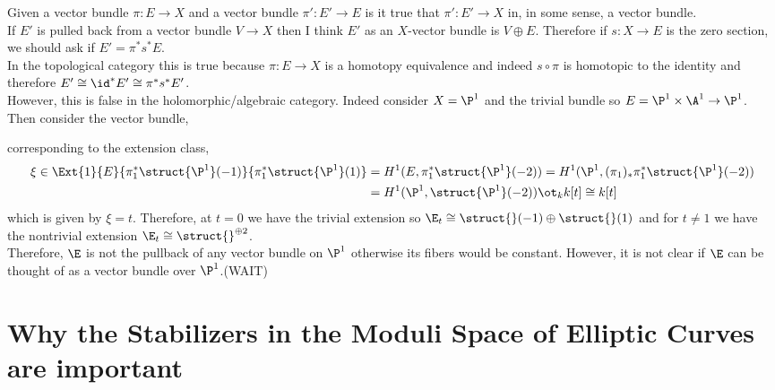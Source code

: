 \documentclass[12pt]{article}
\begin{document}
Given a vector bundle $\pi : E \to X$ and a vector bundle $\pi' : E' \to E$ is it true that $\pi' : E' \to X$ in, in some sense, a vector bundle. 
\bigskip\\
If $E'$ is pulled back from a vector bundle $V \to X$ then I think $E'$ as an $X$-vector bundle is $V \oplus E$. Therefore if $s : X \to E$ is the zero section, we should ask if $E' = \pi^* s^* E$. 
\bigskip\\
In the topological category this is true because $\pi : E \to X$ is a homotopy equivalence and indeed $s \circ \pi$ is homotopic to the identity and therefore $E' \cong \id^* E' \cong \pi^* s^* E'$. 
\bigskip\\
However, this is false in the holomorphic/algebraic category. Indeed consider $X = \P^1$ and the trivial bundle so $E = \P^1 \times \A^1 \to \P^1$. Then consider the vector bundle,
\begin{center}
\end{center}
corresponding to the extension class,
\begin{align*}
\xi \in \Ext{1}{E}{\pi_1^* \struct{\P^1}(-1)}{\pi_1^* \struct{\P^1}(1)} & = H^1(E, \pi_1^* \struct{\P^1}(-2)) = H^1(\P^1, (\pi_1)_* \pi_1^* \struct{\P^1}(-2))
\\
& = H^1(\P^1, \struct{\P^1}(-2)) \ot_k k[t] \cong k[t]
\end{align*}
which is given by $\xi = t$. Therefore, at $t = 0$ we have the trivial extension so $\E_t \cong \struct{}(-1) \oplus \struct{}(1)$ and for $t \neq 1$ we have the nontrivial extension $\E_t \cong \struct{}^{\oplus 2}$.
\bigskip\\
Therefore, $\E$ is not the pullback of any vector bundle on $\P^1$ otherwise its fibers would be constant. However, it is not clear if $\E$ can be thought of as a vector bundle over $\P^1$.(WAIT)

\section{Why the Stabilizers in the Moduli Space of Elliptic Curves are important}
\end{document}
